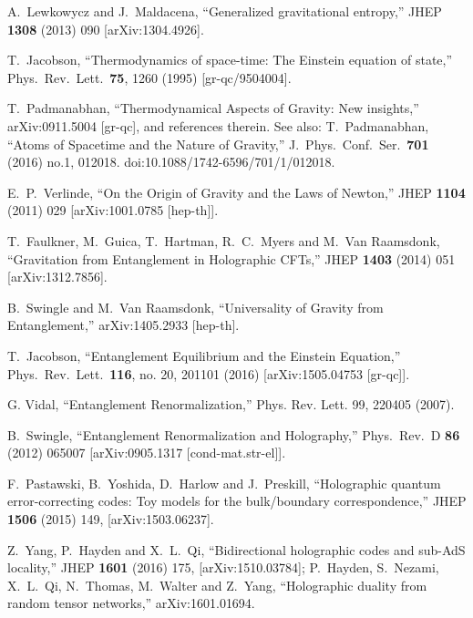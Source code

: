 \documentclass[a4paper,12pt]{article}
\begin{document}
\begin{thebibliography}{100}
  A.~Lewkowycz and J.~Maldacena,
  ``Generalized gravitational entropy,''
  JHEP {\bf 1308} (2013) 090
  [arXiv:1304.4926].

 
  T.~Jacobson,
  ``Thermodynamics of space-time: The Einstein equation of state,''
  Phys.\ Rev.\ Lett.\  {\bf 75}, 1260 (1995)
  [gr-qc/9504004].

 T.~Padmanabhan,
``Thermodynamical Aspects of Gravity: New insights,'' arXiv:0911.5004 [gr-qc], and references therein. 
  See also:  T.~Padmanabhan,
  ``Atoms of Spacetime and the Nature of Gravity,''
  J.\ Phys.\ Conf.\ Ser.\  {\bf 701} (2016) no.1,  012018.
  doi:10.1088/1742-6596/701/1/012018.

  E.~P.~Verlinde,
  ``On the Origin of Gravity and the Laws of Newton,''
  JHEP {\bf 1104} (2011) 029
  [arXiv:1001.0785 [hep-th]].


  T.~Faulkner, M.~Guica, T.~Hartman, R.~C.~Myers and M.~Van Raamsdonk,
  ``Gravitation from Entanglement in Holographic CFTs,''
  JHEP {\bf 1403} (2014) 051
  [arXiv:1312.7856].

  B.~Swingle and M.~Van Raamsdonk,
  ``Universality of Gravity from Entanglement,''
  arXiv:1405.2933 [hep-th].  %


  T.~Jacobson,
  ``Entanglement Equilibrium and the Einstein Equation,''
  Phys.\ Rev.\ Lett.\  {\bf 116}, no. 20, 201101 (2016)
  [arXiv:1505.04753 [gr-qc]].
  
G. Vidal, ``Entanglement Renormalization,'' Phys. Rev. Lett. 99, 220405 (2007).

  B.~Swingle,
  ``Entanglement Renormalization and Holography,''
  Phys.\ Rev.\ D {\bf 86} (2012) 065007
 [arXiv:0905.1317 [cond-mat.str-el]].

 F.~Pastawski, B.~Yoshida, D.~Harlow and J.~Preskill,
 ``Holographic quantum error-correcting codes: Toy models for the bulk/boundary correspondence,''
 JHEP {\bf 1506} (2015) 149,
 [arXiv:1503.06237].

 Z.~Yang, P.~Hayden and X.~L.~Qi,
 ``Bidirectional holographic codes and sub-AdS locality,''
 JHEP {\bf 1601} (2016) 175,  [arXiv:1510.03784]; 
 P.~Hayden, S.~Nezami, X.~L.~Qi, N.~Thomas, M.~Walter and Z.~Yang,
 ``Holographic duality from random tensor networks,''
 arXiv:1601.01694.


\end{thebibliography}
\end{document}

